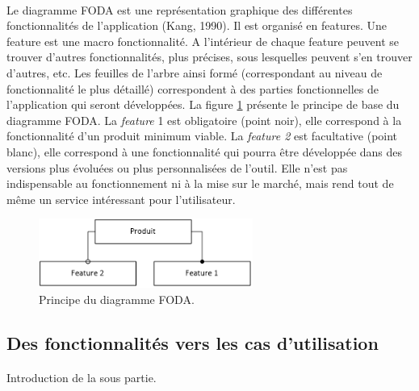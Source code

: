 			\paragraph{}%
			Le diagramme FODA est une représentation graphique des différentes
			fonctionnalités de l’application (Kang, 1990). Il est organisé en features.
			Une feature est une macro fonctionnalité. A l’intérieur de chaque feature
			peuvent se trouver d’autres fonctionnalités, plus précises, sous lesquelles
			peuvent s’en trouver d’autres, etc. Les feuilles de l’arbre ainsi formé
			(correspondant au niveau de fonctionnalité le plus détaillé) correspondent à
			des parties fonctionnelles de l’application qui seront développées.\newline
			La figure \ref{foda_legende} présente le principe de base du diagramme FODA.
			La \textit{feature} 1 est obligatoire (point noir), elle correspond à la
			fonctionnalité d'un produit minimum viable. La \textit{feature 2} est
			facultative (point blanc), elle correspond à une fonctionnalité qui pourra être
			développée dans des versions plus évoluées ou plus personnalisées de
			l’outil. Elle n’est pas indispensable au fonctionnement ni à la mise sur le
			marché, mais rend tout de même un service intéressant pour l'utilisateur.
			\begin{figure}[H]%
				\centering
				\includegraphics[width=7cm]{../img/foda_legende.png}
				\caption{\label{foda_legende} Principe du diagramme FODA.}
			\end{figure}
			
			\paragraph{}%
	
	\subsection{Des fonctionnalités vers les cas d'utilisation}
		\paragraph{}
		Introduction de la sous partie.
		
